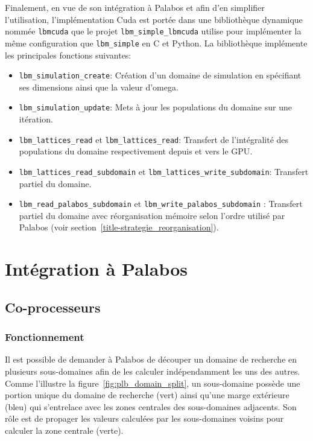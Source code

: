 Finalement, en vue de son intégration à Palabos et afin d'en simplifier l'utilisation, l'implémentation Cuda est portée dans une bibliothèque dynamique nommée \texttt{lbmcuda} que le projet \texttt{lbm\_simple\_lbmcuda} utilise pour implémenter la même configuration que \texttt{lbm\_simple} en C et Python. La bibliothèque implémente les principales fonctions suivantes:

\begin{itemize}
\item \texttt{lbm\_simulation\_create}: Création d'un domaine de simulation en spécifiant ses dimensions ainsi que la valeur d'omega.
\item \texttt{lbm\_simulation\_update}: Mets à jour les populations du domaine sur une itération.
\item \texttt{lbm\_lattices\_read} et \texttt{lbm\_lattices\_read}: Transfert de l'intégralité des populations du domaine respectivement depuis et vers le \acs{GPU}.
\item \texttt{lbm\_lattices\_read\_subdomain} et \texttt{lbm\_lattices\_write\_subdomain}: Transfert partiel du domaine.
\item \texttt{lbm\_read\_palabos\_subdomain} et \texttt{lbm\_write\_palabos\_subdomain} : Transfert partiel du domaine avec réorganisation mémoire selon l'ordre utilisé par Palabos (voir section~\ref{title-strategie_reorganisation}).
\end{itemize}

\section{Intégration à Palabos}
\subsection{Co-processeurs}
\subsubsection{Fonctionnement}
Il est possible de demander à Palabos de découper un domaine de recherche en plusieurs sous-domaines afin de les calculer indépendamment les uns des autres. Comme l'illustre la figure~\ref{fig:plb_domain_split}, un sous-domaine possède une portion unique du domaine de recherche (vert) ainsi qu'une marge extérieure (bleu) qui s'entrelace avec les zones centrales des sous-domaines adjacents. Son rôle est de propager les valeurs calculées par les sous-domaines voisins pour calculer la zone centrale (verte).

